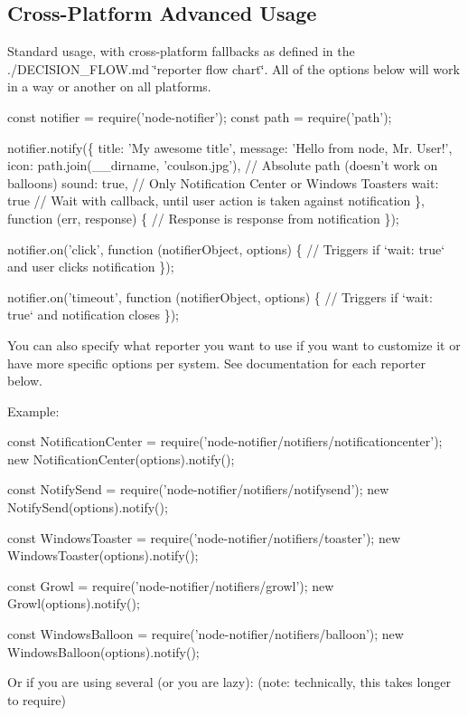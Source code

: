 \subsection*{Cross-\/\+Platform Advanced Usage}

Standard usage, with cross-\/platform fallbacks as defined in the ./\+D\+E\+C\+I\+S\+I\+O\+N\+\_\+\+F\+L\+OW.md \char`\"{}reporter flow chart\char`\"{}. All of the options below will work in a way or another on all platforms.


\begin{DoxyCode}
const notifier = require('node-notifier');
const path = require('path');

notifier.notify(\{
  title: 'My awesome title',
  message: 'Hello from node, Mr. User!',
  icon: path.join(\_\_dirname, 'coulson.jpg'), // Absolute path (doesn't work on balloons)
  sound: true, // Only Notification Center or Windows Toasters
  wait: true // Wait with callback, until user action is taken against notification
\}, function (err, response) \{
  // Response is response from notification
\});

notifier.on('click', function (notifierObject, options) \{
  // Triggers if `wait: true` and user clicks notification
\});

notifier.on('timeout', function (notifierObject, options) \{
  // Triggers if `wait: true` and notification closes
\});
\end{DoxyCode}


You can also specify what reporter you want to use if you want to customize it or have more specific options per system. See documentation for each reporter below.

Example\+: 
\begin{DoxyCode}
const NotificationCenter = require('node-notifier/notifiers/notificationcenter');
new NotificationCenter(options).notify();

const NotifySend = require('node-notifier/notifiers/notifysend');
new NotifySend(options).notify();

const WindowsToaster = require('node-notifier/notifiers/toaster');
new WindowsToaster(options).notify();

const Growl = require('node-notifier/notifiers/growl');
new Growl(options).notify();

const WindowsBalloon = require('node-notifier/notifiers/balloon');
new WindowsBalloon(options).notify();
\end{DoxyCode}


Or if you are using several (or you are lazy)\+: (note\+: technically, this takes longer to require)


